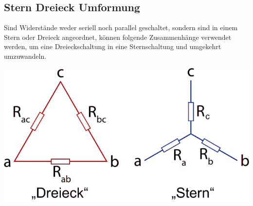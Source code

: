 										\begin{center}
										\end{center}




										\subsection{Stern Dreieck Umformung}
										Sind Widerstände weder seriell noch parallel geschaltet, sondern sind in einem Stern oder Dreieck angeordnet,
										können folgende Zusammenhänge verwendet werden, um eine Dreieckschaltung in eine Sternschaltung und umgekehrt umzuwandeln.
										\begin{center}
		\includegraphics[scale=0.3]{img/Stern-Dreieck-Transformation.png}
\end{center}

